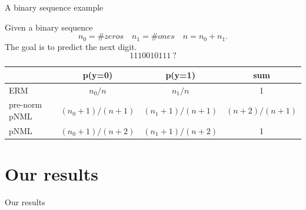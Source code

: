 \documentclass[aspectratio=169]{beamer}
\begin{document}
\begin{frame}{A binary sequence example}
\centering
\begin{Example}
    Given a binary sequence  
    \begin{equation}
    n_0 = \#zeros \quad n_1 = \#ones \quad n = n_0 + n_1.
    \end{equation}
    The goal is to predict the next digit. \\
    \begin{equation*}
    1110010111 \ ?   
    \end{equation*}
    \pause
    \centering
    \begin{tabular}{l|c|c|c}
        & p(y=0)    & p(y=1) & sum    \\
        \hline
        ERM    &   $n_0/n$        &  $n_1/n$ & 1   \\
        \hline
        pre-norm pNML &   $(n_0+1)/(n+1)$        &  $(n_1+1)/(n+1)$ & $(n+2)/(n+1)$  \\
        \hline
        pNML &   $(n_0+1)/(n+2)$        &  $(n_1+1)/(n+2)$ & 1  \\
    \end{tabular}
\end{Example}
\end{frame}

\section{Our results}
\begin{frame}[c]
\begin{center}
\Huge Our results
\end{center}
\end{frame}



\end{document}
